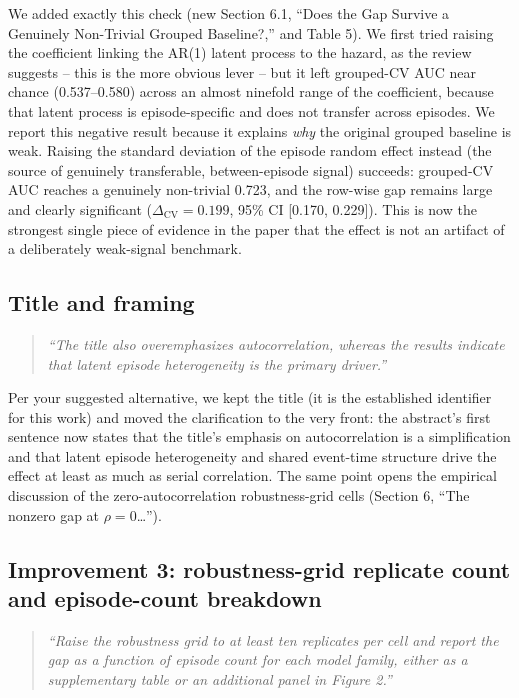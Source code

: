 \documentclass[11pt]{article}
\newcommand{\DeltaCV}{\Delta_{\text{CV}}}
\newcommand{\rc}[1]{\textit{``#1''}}
\newenvironment{response}{\begin{quote}\color{black}}{\end{quote}}
\begin{document}
We added exactly this check (new Section 6.1, ``Does the Gap Survive a Genuinely Non-Trivial Grouped Baseline?,'' and Table 5). We first tried raising the coefficient linking the AR(1) latent process to the hazard, as the review suggests -- this is the more obvious lever -- but it left grouped-CV AUC near chance (0.537--0.580) across an almost ninefold range of the coefficient, because that latent process is episode-specific and does not transfer across episodes. We report this negative result because it explains \emph{why} the original grouped baseline is weak. Raising the standard deviation of the episode random effect instead (the source of genuinely transferable, between-episode signal) succeeds: grouped-CV AUC reaches a genuinely non-trivial 0.723, and the row-wise gap remains large and clearly significant ($\DeltaCV = 0.199$, 95\% CI [0.170, 0.229]). This is now the strongest single piece of evidence in the paper that the effect is not an artifact of a deliberately weak-signal benchmark.

\subsection*{Title and framing}

\begin{response}
\rc{The title also overemphasizes autocorrelation, whereas the results indicate that latent episode heterogeneity is the primary driver.}
\end{response}

Per your suggested alternative, we kept the title (it is the established identifier for this work) and moved the clarification to the very front: the abstract's first sentence now states that the title's emphasis on autocorrelation is a simplification and that latent episode heterogeneity and shared event-time structure drive the effect at least as much as serial correlation. The same point opens the empirical discussion of the zero-autocorrelation robustness-grid cells (Section 6, ``The nonzero gap at $\rho=0$\dots'').

\subsection*{Improvement 3: robustness-grid replicate count and episode-count breakdown}

\begin{response}
\rc{Raise the robustness grid to at least ten replicates per cell and report the gap as a function of episode count for each model family, either as a supplementary table or an additional panel in Figure 2.}
\end{response}
\end{document}
